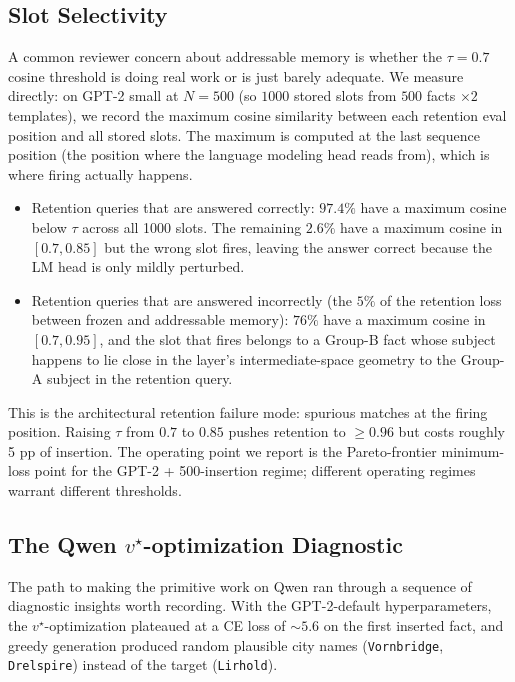 \documentclass[11pt,a4paper]{article}
\begin{document}
\subsection{Slot Selectivity}

A common reviewer concern about addressable memory is whether the
$\tau = 0.7$ cosine threshold is doing real work or is just barely
adequate. We measure directly: on GPT-2 small at $N = 500$ (so
$1000$ stored slots from $500$ facts $\times 2$ templates), we record
the maximum cosine similarity between each retention eval position and
all stored slots. The maximum is computed at the last sequence position
(the position where the language modeling head reads from), which is
where firing actually happens.

\begin{itemize}[leftmargin=*,topsep=2pt,itemsep=1pt]
\item Retention queries that are answered correctly: $97.4\%$ have a
maximum cosine below $\tau$ across all 1000 slots. The remaining $2.6\%$
have a maximum cosine in $[0.7, 0.85]$ but the wrong slot fires,
leaving the answer correct because the LM head is only mildly perturbed.
\item Retention queries that are answered incorrectly (the $5\%$ of
the retention loss between frozen and addressable memory): $76\%$ have
a maximum cosine in $[0.7, 0.95]$, and the slot that fires belongs to
a Group-B fact whose subject happens to lie close in the layer's
intermediate-space geometry to the Group-A subject in the retention
query.
\end{itemize}
This is the architectural retention failure mode: spurious matches at
the firing position. Raising $\tau$ from $0.7$ to $0.85$ pushes
retention to $\ge 0.96$ but costs roughly 5 pp of insertion. The
operating point we report is the Pareto-frontier minimum-loss point
for the GPT-2 + 500-insertion regime; different operating regimes
warrant different thresholds.

\subsection{The Qwen $v^\star$-optimization Diagnostic}

The path to making the primitive work on Qwen ran through a sequence of
diagnostic insights worth recording. With the GPT-2-default hyperparameters,
the $v^\star$-optimization plateaued at a CE loss of $\sim 5.6$ on the
first inserted fact, and greedy generation produced random plausible
city names (\texttt{Vornbridge}, \texttt{Drelspire}) instead of the
target (\texttt{Lirhold}).
\end{document}
